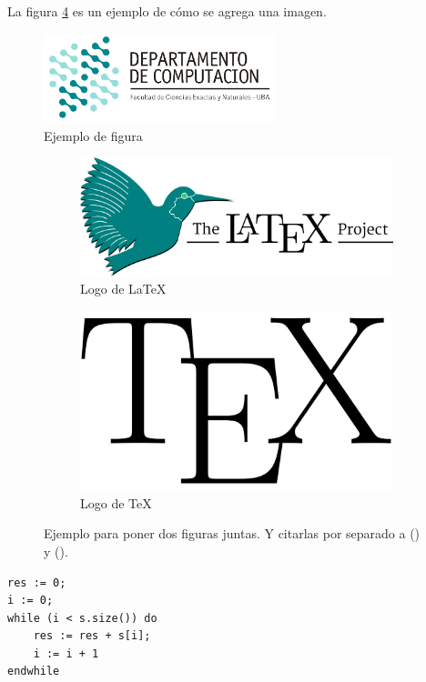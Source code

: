 \documentclass[10pt,a4paper]{article}
\begin{document}
La figura \ref{fig:subfigs} es un ejemplo de cómo se agrega una imagen.

\begin{figure}[ht]
	\centering
	\includegraphics[width=0.6\textwidth]{logo_dc.jpg}
	\caption{Ejemplo de figura}
	\label{fig:ejemplo}
\end{figure}

\begin{figure}[ht!]
	\begin{subfigure}{0.5\textwidth}
		\includegraphics[width=0.9\linewidth]{LaTeX-project} 
		\caption{Logo de LaTeX}
		\label{fig:subfig1}
	\end{subfigure}
	\begin{subfigure}{0.5\textwidth}
		\includegraphics[width=0.7\linewidth]{TeX}
		\caption{Logo de TeX}
		\label{fig:subfig2}
	\end{subfigure}
	\caption{Ejemplo para poner dos figuras juntas. Y citarlas por separado a () y ().}
	\label{fig:subfigs}
\end{figure}



	\begin{lstlisting}[caption={Ejemplo de código (usando los estilos de la cátedra, ver las macros para más detalles)},label=code:for]
res := 0;
i := 0;
while (i < s.size()) do
	res := res + s[i];
	i := i + 1
endwhile
	\end{lstlisting}
\end{document}
